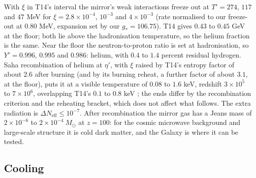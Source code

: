 \documentclass[11pt]{article}
\theoremstyle{definition}
\newcommand{\Msun}{M_{\odot}}
\begin{document}
With $\xi$ in T14's interval the mirror's weak interactions freeze out at $T' = 274$, $117$ and $47$ MeV for $\xi = 2.8 \times 10^{-4}$, $10^{-3}$ and $4 \times 10^{-3}$ (rate normalised to our freeze-out at $0.80$ MeV, expansion set by our $g_{*} = 106.75$). T14 gives $0.43$ to $0.45$ GeV at the floor; both lie above the hadronisation temperature, so the helium fraction is the same. Near the floor the neutron-to-proton ratio is set at hadronisation, so $Y' = 0.996$, $0.995$ and $0.986$: helium, with $0.4$ to $1.4$ percent residual hydrogen. Saha recombination of helium at $\eta'$, with $\xi$ raised by T14's entropy factor of about $2.6$ after burning (and by its burning reheat, a further factor of about $3.1$, at the floor), puts it at a visible temperature of $0.08$ to $1.6$ keV, redshift $3 \times 10^{5}$ to $7 \times 10^{6}$, overlapping T14's $0.1$ to $0.8$ keV \cite[Prop.~4.6]{ButlerT14}; the ends differ by the recombination criterion and the reheating bracket, which does not affect what follows. The extra radiation is $\Delta N_{\mathrm{eff}} \le 10^{-7}$. After recombination the mirror gas has a Jeans mass of $2 \times 10^{-6}$ to $2 \times 10^{-4}\ \Msun$ at $z = 100$: for the cosmic microwave background and large-scale structure it is cold dark matter, and the Galaxy is where it can be tested.

\subsection{Cooling}
\end{document}
